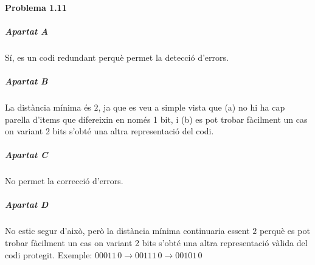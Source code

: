 \documentclass[catalan,border=15pt,class=scrartcl,multi=minipage]{standalone}
\begin{document}
\begin{minipage}{30em}

\paragraph{Problema 1.11}

\subparagraph{Apartat A}

Sí, es un codi redundant perquè permet la detecció d'errors.

\subparagraph{Apartat B}

La distància mínima és $2$, ja que es veu a simple vista que (a) no hi
ha cap parella d'items que difereixin en només 1 bit, i (b) es pot trobar fàcilment
un cas on variant 2 bits s'obté una altra representació del codi.

\subparagraph{Apartat C}

No permet la correcció d'errors.

\subparagraph{Apartat D}

No estic segur d'això, però la distància mínima continuaria essent $2$
perquè es pot trobar fàcilment un cas on variant 2 bits s'obté una altra representació
vàlida del codi protegit. Exemple: $00011\,0 \rightarrow 00111\,0 \rightarrow 00101\,0$

\end{minipage}
\end{document}
